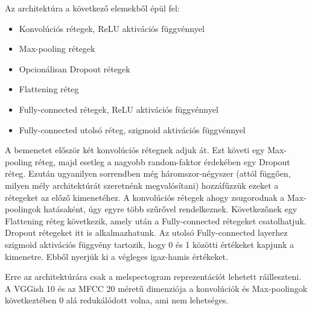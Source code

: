 Az architektúra a következő elemekből épül fel:

\begin{itemize}
 \item Konvolúciós rétegek, ReLU aktivációs függvénnyel
 \item Max-pooling rétegek
 \item Opcionálisan Dropout rétegek
 \item Flattening réteg
 \item Fully-connected rétegek, ReLU aktivációs függvénnyel
 \item Fully-connected utolsó réteg, szigmoid aktivációs függvénnyel
\end{itemize}

A bemenetet először két konvolúciós rétegnek adjuk át. Ezt követi egy Max-pooling réteg, majd esetleg a nagyobb random-faktor érdekében egy Dropout réteg. Ezután ugyanilyen sorrendben még háromszor-négyszer (attól függően, milyen mély architektúrát szeretnénk megvalósítani) hozzáfűzzük ezeket a rétegeket az előző kimenetéhez. A konvolúciós rétegek ahogy zsugorodnak a Max-poolingok hatásaként, úgy egyre több szűrővel rendelkeznek. Következőnek egy Flattening réteg következik, amely után a Fully-connected rétegeket csatolhatjuk. Dropout rétegeket itt is alkalmazhatunk. Az utolsó Fully-connected layerhez szigmoid aktivációs függvény tartozik, hogy 0 és 1 közötti értékeket kapjunk a kimenetre. Ebből nyerjük ki a végleges igaz-hamis értékeket.

Erre az architektúrára csak a melspectogram reprezentációt lehetett ráilleszteni. A VGGish 10 és az MFCC 20 méretű dimenziója a konvolúciók és Max-poolingok következtében 0 alá redukálódott volna, ami nem lehetséges.


